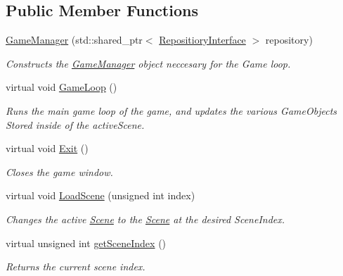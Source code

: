 \subsection*{Public Member Functions}
\begin{DoxyCompactItemize}
\item 
\hyperlink{class_game_manager_a05f6a37de95fcea1313fe4476b95941d}{Game\+Manager} (std\+::shared\+\_\+ptr$<$ \hyperlink{class_repositiory_interface}{Repositiory\+Interface} $>$ repository)
\begin{DoxyCompactList}\small\item\em Constructs the \hyperlink{class_game_manager}{Game\+Manager} object neccesary for the Game loop. \end{DoxyCompactList}\item 
\mbox{\label{class_game_manager_a5baa570812ae717f809fe0dc48bde22e}} 
virtual void \hyperlink{class_game_manager_a5baa570812ae717f809fe0dc48bde22e}{Game\+Loop} ()
\begin{DoxyCompactList}\small\item\em Runs the main game loop of the game, and updates the various Game\+Objects Stored inside of the active\+Scene. \end{DoxyCompactList}\item 
\mbox{\label{class_game_manager_acbd9fb84f9e18c8cb585738d5c89a2b9}} 
virtual void \hyperlink{class_game_manager_acbd9fb84f9e18c8cb585738d5c89a2b9}{Exit} ()
\begin{DoxyCompactList}\small\item\em Closes the game window. \end{DoxyCompactList}\item 
virtual void \hyperlink{class_game_manager_a09b8801bcfdd8d5cbc52e27895b84e3b}{Load\+Scene} (unsigned int index)
\begin{DoxyCompactList}\small\item\em Changes the active \hyperlink{class_scene}{Scene} to the \hyperlink{class_scene}{Scene} at the desired Scene\+Index. \end{DoxyCompactList}\item 
virtual unsigned int \hyperlink{class_game_manager_ab91d1bf5ce2a0e12f0528f530df47271}{get\+Scene\+Index} ()
\begin{DoxyCompactList}\small\item\em Returns the current scene index. \end{DoxyCompactList}\end{DoxyCompactItemize}

